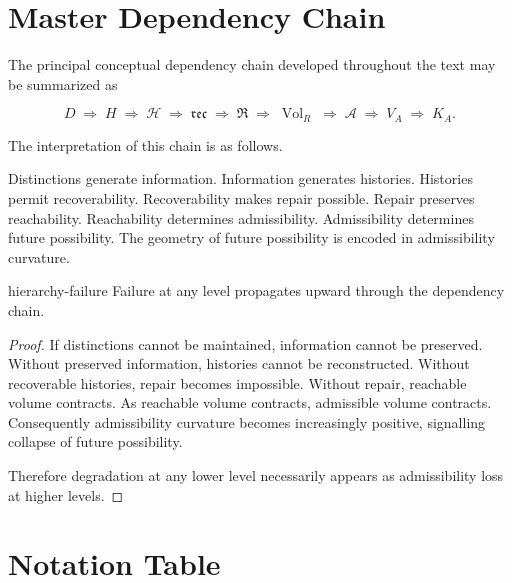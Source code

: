 \documentclass[12pt,twoside,openright]{book}
\newcommand{\hist}{\mathcal{H}}
\newcommand{\repair}{\mathfrak{R}}
\newcommand{\reco}{\mathfrak{rec}}
\newcommand{\Vol}{\operatorname{Vol}}
\begin{document}
\section{Master Dependency Chain}

The principal conceptual dependency chain developed
throughout the text may be summarized as

\[
D
\;\Longrightarrow\;
H
\;\Longrightarrow\;
\hist
\;\Longrightarrow\;
\reco
\;\Longrightarrow\;
\repair
\;\Longrightarrow\;
\Vol_R
\;\Longrightarrow\;
\mathcal A
\;\Longrightarrow\;
V_A
\;\Longrightarrow\;
K_A.
\]

The interpretation of this chain is as follows.

Distinctions generate information.
Information generates histories.
Histories permit recoverability.
Recoverability makes repair possible.
Repair preserves reachability.
Reachability determines admissibility.
Admissibility determines future possibility.
The geometry of future possibility is encoded in
admissibility curvature.

\begin{proposition}{hierarchy-failure}
Failure at any level propagates upward through the
dependency chain.
\end{proposition}

\begin{proof}
If distinctions cannot be maintained, information cannot
be preserved. Without preserved information, histories
cannot be reconstructed. Without recoverable histories,
repair becomes impossible. Without repair, reachable
volume contracts. As reachable volume contracts,
admissible volume contracts. Consequently admissibility
curvature becomes increasingly positive, signalling
collapse of future possibility.

Therefore degradation at any lower level necessarily
appears as admissibility loss at higher levels.
\end{proof}

\section{Notation Table}
\end{document}
